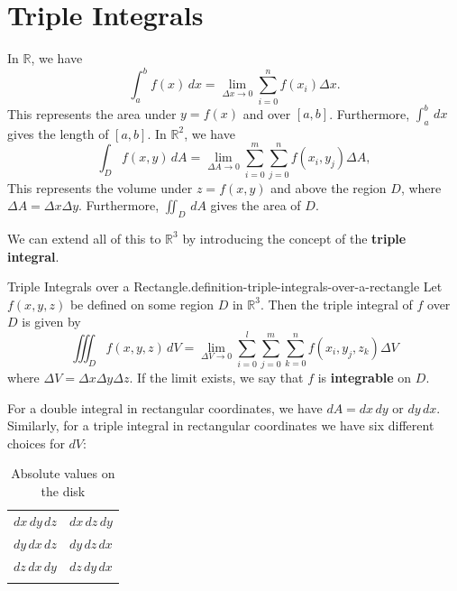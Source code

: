 \documentclass[10pt,]{book}
\newcommand{\terminology}[1]{\textbf{#1}}
\numberwithin{equation}{section}
\newcommand{\hrulethick} {\noalign{\hrule height 0.11em}}
\newcommand{\RR}{\mathbb{R}}
\begin{document}
\section[{Triple Integrals}]{Triple Integrals}\label{section-triple-integrals}
\hypertarget{p-1503}{}%
In \(\RR\), we have%
\begin{equation*}
\int_{a}^{b}f(x)\,dx = \lim_{\Delta x\to0}\sum_{i=0}^{n}f(x_{i})\Delta x.
\end{equation*}
This represents the area under \(y=f(x)\) and over \([a,b]\). Furthermore, \(\int_{a}^{b}\,dx\) gives the length of \([a,b]\). In \(\mathbb{R}^{2}\), we have%
\begin{equation*}
\int_{D}f(x,y)\,dA = \lim_{\Delta A\to0}\sum_{i=0}^{m}\sum_{j=0}^{n}f(x_{i},y_{j})\Delta A,
\end{equation*}
This represents the volume under \(z = f(x,y)\) and above the region \(D\), where \(\Delta A = \Delta x\Delta y\). Furthermore, \(\iint_{D}\,dA\) gives the area of \(D\).%
\par
\hypertarget{p-1504}{}%
We can extend all of this to \(\RR^{3}\) by introducing the concept of the \terminology{triple integral}.%
\begin{definition}{Triple Integrals over a Rectangle.}{definition-triple-integrals-over-a-rectangle}%
\hypertarget{p-1505}{}%
Let \(f(x,y,z)\) be defined on some region \(D\) in \(\RR^{3}\). Then the triple integral of \(f\) over \(D\) is given by%
\begin{equation*}
\iiint_{D}f(x,y,z)\,dV = \lim_{\Delta V\to0}\sum_{i=0}^{l}\sum_{j=0}^{m}\sum_{k=0}^{n}f(x_{i},y_{j},z_{k})\Delta V
\end{equation*}
where \(\Delta V = \Delta x\Delta y\Delta z\). If the limit exists, we say that \(f\) is \terminology{integrable} on \(D\).%
\end{definition}
\hypertarget{p-1506}{}%
For a double integral in rectangular coordinates, we have \(dA = dx\,dy\) or \(dy\,dx\). Similarly, for a triple integral in rectangular coordinates we have six different choices for \(dV\): \begin{table}
\centering
\begin{tabular}{cc}\hrulethick
\(dx\,dy\,dz\)&\(dx\,dz\,dy\)\tabularnewline[0pt]
\(dy\,dx\,dz\)&\(dy\,dz\,dx\)\tabularnewline[0pt]
\(dz\,dx\,dy\)&\(dz\,dy\,dx\)\tabularnewline\hrulethick
\end{tabular}
\caption{Absolute values on the disk\label{table-volume-elements}}
\end{table}
\end{document}
